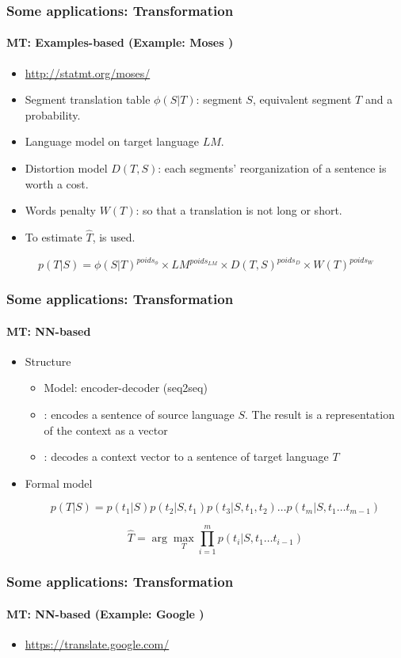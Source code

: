 \documentclass[xcolor=table]{beamer}
\begin{document}
\begin{frame}
	\frametitle{Some applications: Transformation}
	\framesubtitle{MT: Examples-based (Example: Moses \cite{07-koehn-al})}
	\begin{itemize}
		\item \url{http://statmt.org/moses/}
		\item Segment translation table $\phi(S|T)$: segment $S$, equivalent segment $T$ and a probability.
		\item Language model on target language $LM$.
		\item Distortion model $ D(T, S) $: each segments' reorganization of a sentence is worth a cost.
		\item Words penalty $W(T)$: so that a translation is not long or short.
		\item To estimate $\hat{T}$,  is used.
	\end{itemize}

	\[p(T|S) = \phi(S|T)^{poids_{\phi}} \times LM^{poids_{LM}} \times D(T, S)^{poids_{D}} \times W(T)^{poids_{W}}\]
\end{frame}

\begin{frame}
	\frametitle{Some applications: Transformation}
	\framesubtitle{MT: NN-based}
	\begin{itemize}
		\item Structure
		\begin{itemize}
			\item Model: encoder-decoder (seq2seq)
			\item {}: encodes a sentence of source language $S$. The result is a representation of the context as a vector
			\item {}: decodes a context vector to a sentence of target language $T$
		\end{itemize}
	
		\item Formal model
		
		\[ p(T|S) = p(t_1|S) p(t_2|S, t_1) p(t_3|S, t_1, t_2)\ldots p(t_m|S, t_1\ldots t_{m-1}) \]
		
		\[\hat{T} = \arg\max_{T} \prod_{i=1}^{m} p(t_i | S, t_1\ldots t_{i-1})\]
	\end{itemize}
\end{frame}

\begin{frame}
	\frametitle{Some applications: Transformation}
	\framesubtitle{MT: NN-based (Example: Google \cite{16-wu-al})}
	\begin{itemize}
		\item \url{https://translate.google.com/}
	\end{itemize}
	\begin{center}
	\end{center}
\end{frame}
\end{document}

